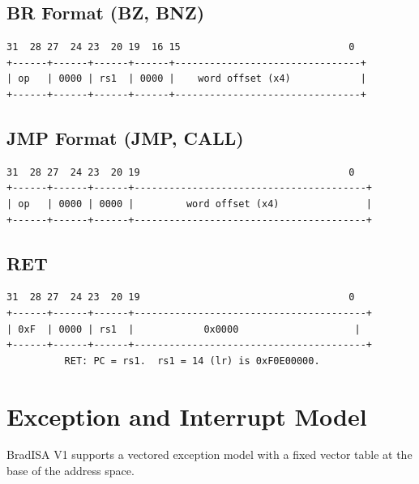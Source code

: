 \documentclass[11pt,a4paper]{article}
\begin{document}
\subsection{BR Format (BZ, BNZ)}
\begin{lstlisting}[style=Cstyle]
  31  28 27  24 23  20 19  16 15                             0
+------+------+------+------+--------------------------------+
| op   | 0000 | rs1  | 0000 |    word offset (x4)            |
+------+------+------+------+--------------------------------+
\end{lstlisting}

\subsection{JMP Format (JMP, CALL)}
\begin{lstlisting}[style=Cstyle]
  31  28 27  24 23  20 19                                    0
+------+------+------+----------------------------------------+
| op   | 0000 | 0000 |         word offset (x4)               |
+------+------+------+----------------------------------------+
\end{lstlisting}

\subsection{RET}
\begin{lstlisting}[style=Cstyle]
  31  28 27  24 23  20 19                                    0
+------+------+------+----------------------------------------+
| 0xF  | 0000 | rs1  |            0x0000                    |
+------+------+------+----------------------------------------+
          RET: PC = rs1.  rs1 = 14 (lr) is 0xF0E00000.
\end{lstlisting}

\newpage

\section{Exception and Interrupt Model}

BradISA V1 supports a vectored exception model with a fixed vector table at
the base of the address space.
\end{document}
